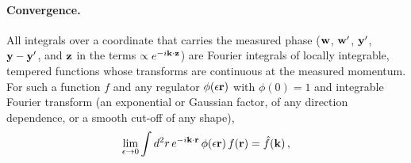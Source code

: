 \paragraph{Convergence.} All integrals over a coordinate that carries the measured phase ($\mathbf{w}$, $\mathbf{w}'$, $\mathbf{y}'$, $\mathbf{y}-\mathbf{y}'$, and $\mathbf{z}$ in the terms $\propto e^{-i\mathbf{k}\cdot\mathbf{z}}$) are Fourier integrals of locally integrable, tempered functions whose transforms are continuous at the measured momentum. For such a function $f$ and any regulator $\phi(\epsilon\mathbf{r})$ with $\phi(0)=1$ and integrable Fourier transform (an exponential or Gaussian factor, of any direction dependence, or a smooth cut-off of any shape),
\begin{align}\label{eq:FTlemma}
\lim_{\epsilon\to0}\int d^2r\,e^{-i\mathbf{k}\cdot\mathbf{r}}\,\phi(\epsilon\mathbf{r})\,f(\mathbf{r})=\hat f(\mathbf{k})\,,
\end{align}

